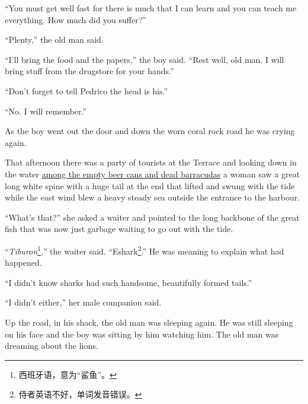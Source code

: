 \documentclass[fontset=ubuntu,zihao=-4]{ctexrep}
\begin{document}
``You must get well fast for there is much that I can learn and you can
teach me everything. How much did you suffer?''

``Plenty,'' the old man said.

``I'll bring the food and the papers,'' the boy said. ``Rest well, old man.
I will bring stuff from the \gls{drugstore} for your hands.''

``Don't forget to tell Pedrico the head is his.''

``No. I will remember.''

As the boy went out the door and down the worn coral rock road he was
crying again.

That afternoon there was a party of tourists at the Terrace and looking down
in the water \uline{among the empty beer cans and dead \glspl{barracuda}} a
woman saw a great long white \gls{spine} with a huge tail at the end that
lifted and swung with the \gls{tide} while the east wind blew a heavy steady
sea outside the \gls{entrance} to the harbour.

``What's that?'' she asked a waiter and pointed to the long backbone of the
great fish that was now just \gls{garbage} waiting to go out with the tide.

``\emph{Tiburon}\footnote{西班牙语，意为“鲨鱼”。},'' the waiter said.
``Eshark\footnote{侍者英语不好，单词发音错误。}.'' He was meaning to explain
what had happened.

``I didn't know sharks had such handsome, \gls{beautifully} formed tails.''

``I didn't either,'' her male \gls{companion} said.

Up the road, in his shack, the old man was sleeping again. He was still
sleeping on his face and the boy was sitting by him watching him. The old
man was dreaming about the lions.




\printunsrtglossary[style={mcolindexgroup },title={Glossary 词汇表}]
\end{document}
